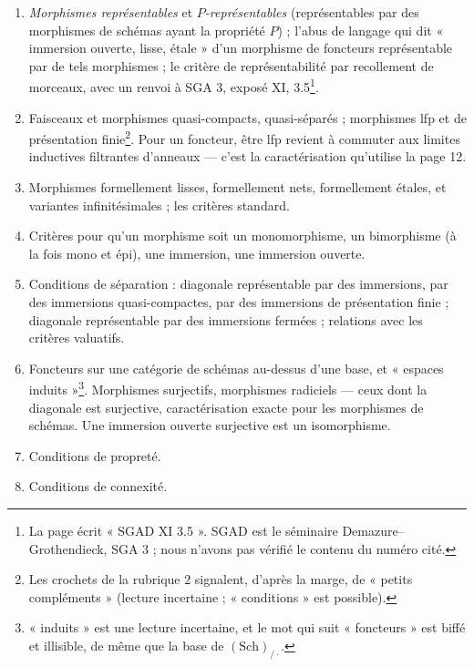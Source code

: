 \documentclass[11pt,a4paper]{article}
\begin{document}
\begin{enumerate}
  \item[1.] \emph{Morphismes représentables} et \emph{$P$-représentables}
    (représentables par des morphismes de schémas ayant la propriété $P$) ;
    l'abus de langage qui dit « immersion ouverte, lisse, étale » d'un morphisme
    de foncteurs représentable par de tels morphismes ; le critère de
    représentabilité par recollement de morceaux, avec un renvoi à SGA 3,
    exposé XI, 3.5\footnote{La page écrit « SGAD XI 3.5 ». SGAD est le
    séminaire Demazure–Grothendieck, SGA 3 ; nous n'avons pas vérifié le
    contenu du numéro cité.}.
  \item[2.] Faisceaux et morphismes quasi-compacts, quasi-séparés ; morphismes
    lfp et de présentation finie\footnote{Les crochets de la rubrique 2
    signalent, d'après la marge, de « petits compléments » (lecture incertaine ;
    « conditions » est possible).}. Pour un foncteur, être lfp revient à
    commuter aux limites inductives filtrantes d'anneaux — c'est la
    caractérisation qu'utilise la page 12.
  \item[3.] Morphismes formellement lisses, formellement nets, formellement
    étales, et variantes infinitésimales ; les critères standard.
  \item[4.] Critères pour qu'un morphisme soit un monomorphisme, un
    bimorphisme (à la fois mono et épi), une immersion, une immersion ouverte.
  \item[5.] Conditions de séparation : diagonale représentable par des
    immersions, par des immersions quasi-compactes, par des immersions de
    présentation finie ; diagonale représentable par des immersions fermées ;
    relations avec les critères valuatifs.
  \item[7.] Foncteurs sur une catégorie de schémas au-dessus d'une base, et
    « espaces induits »\footnote{« induits » est une lecture incertaine, et le
    mot qui suit « foncteurs » est biffé et illisible, de même que la base de
    $(\mathrm{Sch})_{/\cdot}$.}. Morphismes surjectifs, morphismes
    radiciels — ceux dont la diagonale est surjective, caractérisation exacte
    pour les morphismes de schémas. Une immersion ouverte surjective est un
    isomorphisme.
  \item[6.] Conditions de propreté.
  \item[8.] Conditions de connexité.
\end{enumerate}
\end{document}
